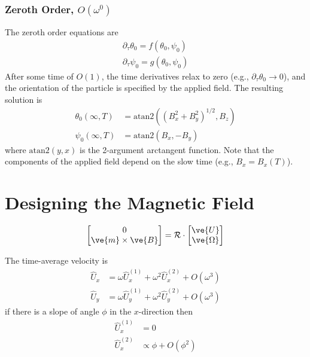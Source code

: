 \subsubsection*{Zeroth Order, $O(\omega^0)$}

The zeroth order equations are 
\begin{align}
    \partial_{\tau} \theta_0 = f(\theta_0,\psi_0)
    \\
    \partial_{\tau} \psi_0 = g(\theta_0,\psi_0)
\end{align}
After some time of $O(1)$, the time derivatives relax to zero (e.g., $\partial_{\tau} \theta_0\rightarrow 0$), and the orientation of the particle is specified by the applied field. The resulting solution is 
\begin{align}
    \theta_0(\infty,T) &= \mathrm{atan2}((B_x^2+B_y^2)^{1/2},B_z) \label{eq:theta0}
    \\
    \psi_0(\infty,T) &= \mathrm{atan2}(B_x,-B_y) \label{eq:psi0}
\end{align}
where $\mathrm{atan2}(y,x)$ is the 2-argument arctangent function. Note that the components of the applied field depend on the slow time (e.g., $B_x = B_x(T)$).

\section{Designing the Magnetic Field}

\begin{equation}
    \begin{bmatrix} 0 \\ \ve{m}\times\ve{B} \end{bmatrix} = \mathcal{R} \cdot \begin{bmatrix} \ve{U} \\ \ve{\Omega} \end{bmatrix} \label{eq:dynamics}
\end{equation}

The time-average velocity is 
\begin{align}
    \hat{U}_x &= \omega \hat{U}_x^{(1)}+\omega^2 \hat {U}_x^{(2)} + O(\omega^3) 
    \\
    \hat{U}_y &= \omega \hat{U}_y^{(1)} + \omega^2 \hat {U}_y^{(2)} + O(\omega^3) 
\end{align}
if there is a slope of angle $\phi$ in the $x$-direction then
\begin{align}
    \hat{U}_x^{(1)} &= 0 
    \\
    \hat {U}_x^{(2)} &\propto \phi + O(\phi^2)
\end{align}

